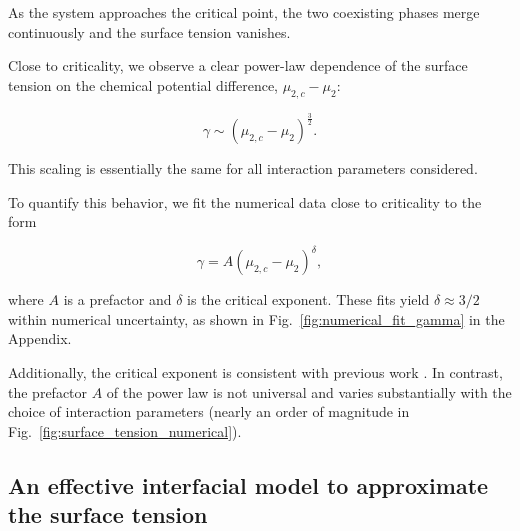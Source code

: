 \documentclass[12pt]{article}
\begin{document}
As the system approaches the critical point, the two coexisting phases merge continuously and the surface tension vanishes.

Close to criticality, we observe a clear power-law dependence of the surface
tension on the chemical potential difference, \(\mu_{2,c}-\mu_2\):

\begin{equation}
\gamma \sim (\mu_{2,c}-\mu_2)^{\frac{3}{2}}.
\end{equation}

This scaling is essentially the same for all interaction parameters considered.

To quantify this behavior, we fit the numerical data close to criticality to the form

\[
\gamma = A(\mu_{2,c}-\mu_2)^{\delta},
\]

where \(A\) is a prefactor and \(\delta\) is the critical exponent. These fits yield \(\delta \approx 3/2\) within numerical uncertainty, as shown in Fig.~\ref{fig:numerical_fit_gamma} in the Appendix.

Additionally, the critical exponent is consistent with previous work \cite{Huang1996AnalyticInterface,Anisimov2024CriticalFluctuations}. In contrast, the prefactor \(A\) of the power law
is not universal and varies substantially with the choice of interaction
parameters (nearly an order of magnitude in Fig.~\ref{fig:surface_tension_numerical}).



\subsection{An effective interfacial model to approximate the surface tension}
\end{document}
